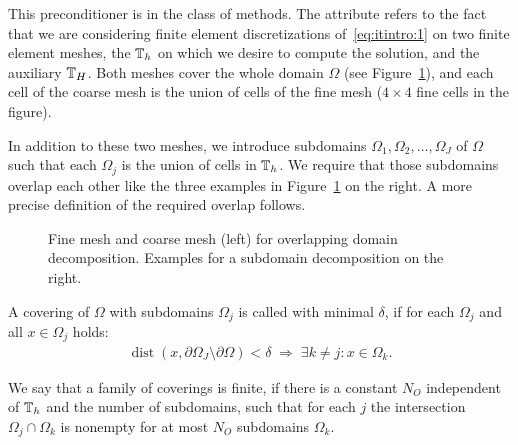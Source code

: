\begin{intro}
  This preconditioner is in the class of  methods. The attribute  refers
  to the fact that we are considering finite element discretizations
  of~\eqref{eq:itintro:1} on two finite element meshes, the
   $\mathbb T_h$ on which we desire to compute the
  solution, and the auxiliary  $\mathbb T_H$. Both
  meshes cover the whole domain $\Omega$ (see
  Figure~\ref{fig:schwarz:ddmeshes}), and each cell of the coarse mesh
  is the union of cells of the fine mesh ($4\times 4$ fine cells in
  the figure).

  In addition to these two meshes, we introduce subdomains
  $\Omega_1,\Omega_2,\dots,\Omega_J$ of $\Omega$ such that each
  $\Omega_j$ is the union of cells in $\mathbb T_h$. We require that those
  subdomains overlap each other like the three examples in
  Figure~\ref{fig:schwarz:ddmeshes} on the right. A more precise
  definition of the required overlap follows.
\end{intro}

\begin{figure}[tp]
  \centering
  \caption{Fine mesh and coarse mesh (left) for overlapping domain
    decomposition. Examples for a subdomain decomposition on the
    right.}
  \label{fig:schwarz:ddmeshes}
\end{figure}

\begin{definition}
  \label{definition:schwarz:overlap}
  A covering of $\Omega$ with subdomains $\Omega_j$ is called
   with minimal  $\delta$, if for
  each $\Omega_j$ and all $x\in\Omega_j$ holds:
  \begin{gather*}
    \operatorname{dist}(x,\partial\Omega_J\setminus\partial\Omega) <
    \delta\;
    \Rightarrow\; \exists k\neq j: x\in \Omega_k.
  \end{gather*}
\end{definition}

\begin{definition}
  \label{definition:schwarz:finite-covering}
  We say that a family of coverings is finite, if
  there is a constant $N_O$ independent of $\mathbb T_h$ and the number of
  subdomains, such that for each $j$ the intersection
  $\Omega_j\cap\Omega_k$ is nonempty for at most $N_O$ subdomains
  $\Omega_k$.
\end{definition}

